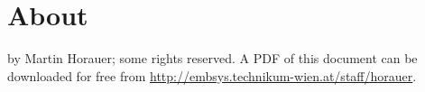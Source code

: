 \section*{About}
\textcopyright{} by Martin Horauer; some rights reserved. 
A PDF of this document can be downloaded for free from 
\url{http://embsys.technikum-wien.at/staff/horauer}.

